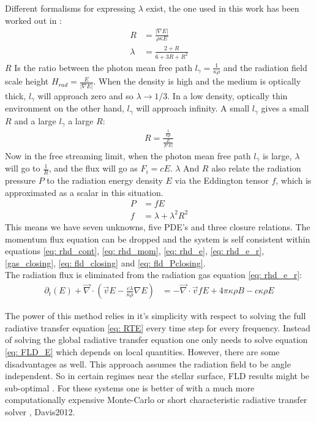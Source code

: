 Different formalisms for expressing $\lambda$ exist, the one used in this work has been worked out in \citep{Levermore1981}:
\begin{align}
R &= \frac{|\nabla E|}{\rho \kappa E} \\
\lambda &= \frac{2 + R}{6 + 3R + R^2} 
\end{align}
$R$ Is the ratio between the photon mean free path $l_\gamma = \frac{1}{\kappa \rho}$ and the radiation field scale height $H_{rad} = \frac{E}{\left| \nabla E \right|}$. When the density is high and the medium is optically thick, $l_\gamma$ will approach zero and so $\lambda \rightarrow 1/3$. In a low density, optically thin environment on the other hand, $l_\gamma$ will approach infinity. A small $l_\gamma$ gives a small $R$ and a large $l_\gamma$ a large $R$:
\begin{align*}
R = \frac{\frac{1}{\kappa \rho}}{\frac{E}{\left| \nabla E \right|}}
\end{align*}
Now in the free streaming limit, when the photon mean free path $l_\gamma$ is large, $\lambda$ will go to $\frac{1}{R}$, and the flux will go as $F_i = cE$. $\lambda$ And $R$ also relate the radiation pressure $P$ to the radiation energy density $E$ via the Eddington tensor $f$, which is approximated as a scalar in this situation.
\begin{align}
P &= f E  \label{eq: fld_Pclosing} \\
f &= \lambda + \lambda^2 R^2
\end{align}
This means we have seven unknowns, five PDE's and three closure relations. The momentum flux equation can be dropped and the system is self consistent within equations \eqref{eq: rhd_cont}, \eqref{eq: rhd_mom}, \eqref{eq: rhd_e}, \eqref{eq: rhd_e_r}, \eqref{gas_closing}, \eqref{eq: fld_closing} and \eqref{eq: fld_Pclosing}. \\

The radiation flux is eliminated from the radiation gas equation \ref{eq: rhd_e_r}:
\begin{align}
 \partial_t \left(E \right) +  \vec{\nabla} \cdot \left( \vec{v} E -\frac{c \lambda}{\kappa \rho} \nabla E \right) &=  -\vec{\nabla} \cdot \vec{v} fE + 4\pi \kappa\rho B - c \kappa \rho E \label{eq: FLD_E}
\end{align}

The power of this method relies in it's simplicity with respect to solving the full radiative transfer equation \eqref{eq: RTE} every time step for every frequency. Instead of solving the global radiative transfer equation one only needs to solve equation \eqref{eq: FLD_E} which depends on local quantities. However, there are some disadvantages as well. This approach assumes the radiation field to be angle independent. So in certain regimes near the stellar surface, FLD results might be sub-optimal \citep{Turner12001}. For these systems one is better of with a much more computationally expensive Monte-Carlo or short characteristic radiative transfer solver \citep{Harries2015}, {Davis2012}.\\

